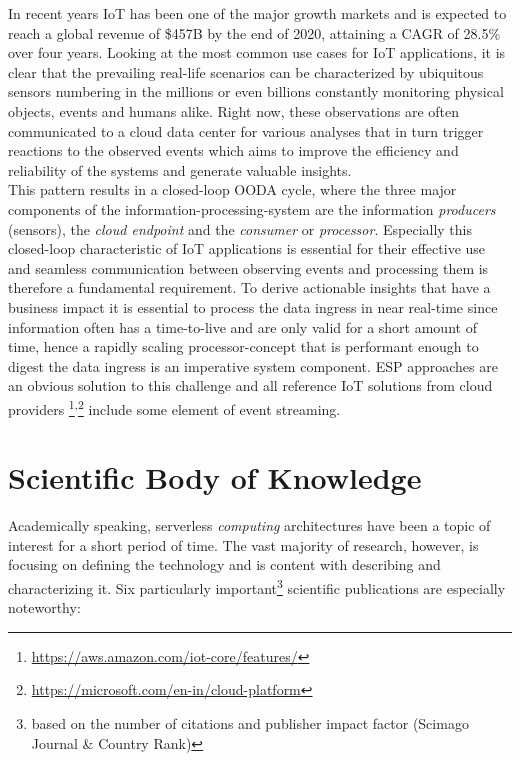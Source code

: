 In recent years \acf{IoT} has been one of the major growth markets and is expected to reach a global revenue of \$457B by the end of 2020\autocite{Columbus20172017Forecasts}, attaining a \acf{CAGR} of 28.5\% over four years.\autocite{Columbus20172017Forecasts} Looking at the most common use cases for IoT applications, it is clear that the prevailing real-life scenarios can be characterized by ubiquitous sensors numbering in the millions or even billions constantly monitoring physical objects, events and humans alike. Right now, these observations are often communicated to a cloud data center for various analyses that in turn trigger reactions to the observed events which aims to improve the efficiency and reliability of the systems and generate valuable insights.\autocite{Yannuzzi2014KeyComputing} \\
This pattern results in a closed-loop \acf{OODA} cycle, where the three major components of the information-processing-system are the information \textit{producers} (sensors), the \textit{cloud endpoint} and the \textit{consumer} or \textit{processor}.\autocite{Shukla2017BenchmarkingApplications} Especially this closed-loop characteristic of IoT applications is essential for their effective use and seamless communication between observing events and processing them is therefore a fundamental requirement. To derive actionable insights that have a business impact it is essential to process the data ingress in near real-time since information often has a time-to-live and are only valid for a short amount of time, hence a rapidly scaling processor-concept that is performant enough to digest the data ingress is an imperative system component. \acf{ESP} approaches are an obvious solution to this challenge and all reference IoT solutions from cloud providers \footnote{\url{https://aws.amazon.com/iot-core/features/}}\textsuperscript{,}\footnote{\url{https://microsoft.com/en-in/cloud-platform}} include some element of event streaming.

\section{Scientific Body of Knowledge}

Academically speaking, serverless \textit{computing} architectures have been a topic of interest for a short period of time. The vast majority of research, however, is focusing on defining the technology and is content with describing and characterizing it. Six particularly important\footnote{based on the number of citations and publisher impact factor (Scimago Journal \& Country Rank)} scientific publications are especially noteworthy:


